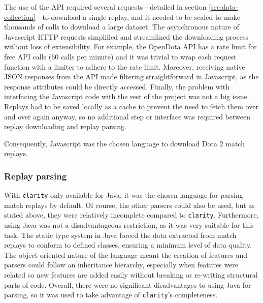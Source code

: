 \documentclass[Report.tex]{subfiles}
\begin{document}
The use of the API required several requests - detailed in section \ref{sec:data-collection} - to download a single replay, and it needed to be scaled to make thousands of calls to download a large dataset. The asynchronous nature of Javascript HTTP requests simplified and streamlined the downloading process without loss of extensibility. For example, the OpenDota API has a rate limit for free API calls (60 calls per minute) and it was trivial to wrap each request function with a limiter to adhere to the rate limit. Moreover, receiving native JSON responses from the API made filtering straightforward in Javascript, as the response attributes could be directly accessed. Finally, the problem with interfacing the Javascript code with the rest of the project was not a big issue. Replays had to be saved locally as a cache to prevent the need to fetch them over and over again anyway, so no additional step or interface was required between replay downloading and replay parsing. 

Consequently, Javascript was the chosen language to download Dota 2 match replays. 

\subsubsection{Replay parsing}
With \texttt{clarity} only available for Java, it was the chosen language for parsing match replays by default. Of course, the other parsers could also be used, but as stated above, they were relatively incomplete compared to \texttt{clarity}. Furthermore, using Java was not a disadvantageous restriction, as it was very suitable for this task. The static type system in Java forced the data extracted from match replays to conform to defined classes, ensuring a minimum level of data quality. The object-oriented nature of the language meant the creation of features and parsers could follow an inheritance hierarchy, especially when features were related so new features are added easily without breaking or re-writing structural parts of code. Overall, there were no significant disadvantages to using Java for parsing, so it was used to take advantage of \texttt{clarity}'s completeness.
\end{document}

